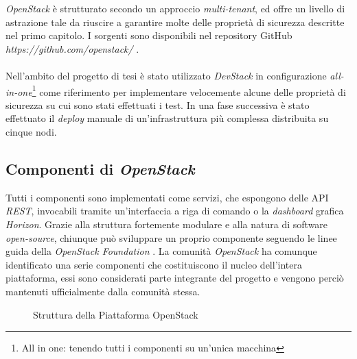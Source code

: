 \documentclass[../main.tex]{subfiles}
\begin{document}
\textit{OpenStack} è strutturato secondo un approccio \textit{multi-tenant}, ed offre un livello di astrazione tale da riuscire a garantire molte delle proprietà di sicurezza descritte nel primo capitolo.
I sorgenti sono disponibili nel repository GitHub \textit{https://github.com/openstack/} .
\paragraph{}
Nell'ambito del progetto di tesi è stato utilizzato \textit{DevStack} in configurazione \textit{all-in-one}\footnote{All in one: tenendo tutti i componenti su un'unica macchina} come riferimento per implementare velocemente alcune delle proprietà di sicurezza su cui sono stati effettuati i test.
In una fase successiva è stato effettuato il \textit{deploy} manuale di un'infrastruttura più complessa distribuita su cinque nodi.

\subsection{Componenti di \textit{OpenStack}}
Tutti i componenti sono implementati come servizi, che espongono delle API \textit{REST}, invocabili tramite un'interfaccia a riga di comando o la \textit{dashboard} grafica \textit{Horizon}.
Grazie alla struttura fortemente modulare e alla natura di software \textit{open-source}, chiunque può sviluppare un proprio componente seguendo le linee guida della \textit{OpenStack Foundation} \cite{GuidelinesOpenstackHacking}.
La comunità \textit{OpenStack} ha comunque identificato una serie componenti che costituiscono il nucleo dell'intera piattaforma, essi sono considerati parte integrante del progetto e vengono perciò mantenuti ufficialmente dalla comunità stessa.
\begin{figure}[H]
\centering
{}
\caption{Struttura della Piattaforma OpenStack \cite{OpenstackDiagram}}\label{openstacksw}
\end{figure}
\end{document}

